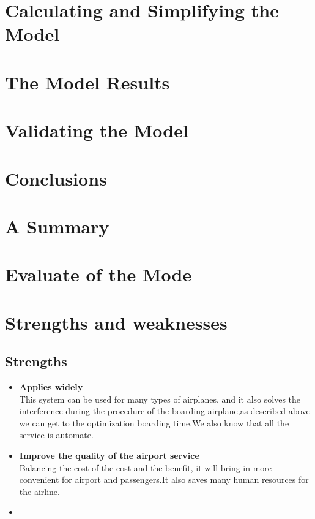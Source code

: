 \documentclass{mcmthesis}
\begin{document}
\section{Calculating and Simplifying the Model  }
\lipsum[11]

\section{The Model Results}
\lipsum[6]

\section{Validating the Model}
\lipsum[9]

\section{Conclusions}
\lipsum[6]

\section{A Summary}
\lipsum[6]

\section{Evaluate of the Mode}

\section{Strengths and weaknesses}
\lipsum[12]

\subsection{Strengths}
\begin{itemize}
\item \textbf{Applies widely}\\
This  system can be used for many types of airplanes, and it also
solves the interference during  the procedure of the boarding
airplane,as described above we can get to the  optimization
boarding time.We also know that all the service is automate.
\item \textbf{Improve the quality of the airport service}\\
Balancing the cost of the cost and the benefit, it will bring in
more convenient  for airport and passengers.It also saves many
human resources for the airline. \item \textbf{}
\end{itemize}
\end{document}
